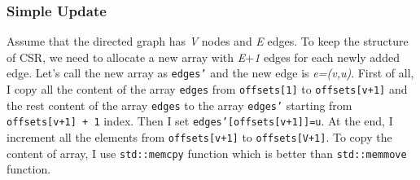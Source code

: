 \documentclass{article}
\begin{document}
 \subsubsection*{Simple Update}
   Assume that the directed graph has \textit{V} nodes and \textit{E} edges. To keep the structure of CSR, we need to allocate a new array with \textit{E}+\textit{1} edges for each newly added edge. Let's call the new array as \texttt{edges'} and the new edge is \textit{e=(v,u)}. First of all, I copy all the content of the array \texttt{edges} from \texttt{offsets[1]} to \texttt{offsets[v+1]} and the rest content of the array \texttt{edges} to the array \texttt{edges'} starting from \texttt{offsets[v+1] + 1} index. Then I set \texttt{edges'[offsets[v+1]]=u}. At the end, I increment all the elements from \texttt{offsets[v+1]} to \texttt{offsets[V+1]}. To copy the content of array, I use \texttt{std::memcpy} function which is better than \texttt{std::memmove} function. 
\end{document}
